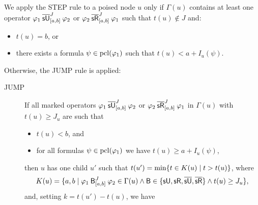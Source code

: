 \documentclass[acmsmall,screen]{acmart}
\begin{document}
We apply the \textsf{STEP} rule to a poised node $u$
only if $\Gamma(u)$ contains at least one operator
${\msuntil[J]{[a,b]}{\varphi_1}{\varphi_2}}$ or $\msrelease[J]{[a,b]}{\varphi_2}{\varphi_1}$
such that $t(u) \not\in J$ and:
\begin{itemize}
\item $t(u) = b$, or
\item there exists a formula $\psi \in \pcl(\varphi_1)$ such that $t(u) < a + I_u(\psi)$.
\end{itemize}
Otherwise, the \textsf{JUMP} rule is applied:
\begin{description}
\item[\textsf{JUMP}]
If all marked operators
$\msuntil[J]{[a,b]}{\varphi_1}{\varphi_2}$ or $\msrelease[J]{[a,b]}{\varphi_2}{\varphi_1}$ in $\Gamma(u)$
with $t(u) \geq J_u$ are such that
\begin{itemize}
\item $t(u) < b$, and
\item for all formulas $\psi \in \pcl(\varphi_1)$ we have $t(u) \geq a + I_u(\psi)$,
\end{itemize}
then $u$ has one child $u'$ such that $t(u') = \min \set{t \in K(u) \mid t > t(u)}$,
where
\[
K(u) = \set{a, b \mid \anybinop[J]{[a,b]}{\varphi_1}{\varphi_2} \in \Gamma(u) \land \mathsf{B} \in \set{\suntilop, \sreleaseop, \marked{\suntilop}, \marked{\sreleaseop}} \land t(u) \geq J_u},
\]
and, setting $k = t(u') - t(u)$, we have
\begin{align}

\end{align}
\end{description}
\end{document}
